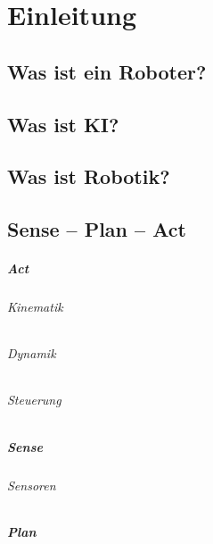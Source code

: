\chapter{Einleitung} %

	\section{Was ist ein Roboter?} %

	\section{Was ist KI?} %

	\section{Was ist Robotik?} %

	\section{Sense -- Plan -- Act} %

		\paragraph{Act} %

			\subparagraph{Kinematik} %

			\subparagraph{Dynamik} %

			\subparagraph{Steuerung} %

		\paragraph{Sense} %

			\subparagraph{Sensoren} %

		\paragraph{Plan} %


